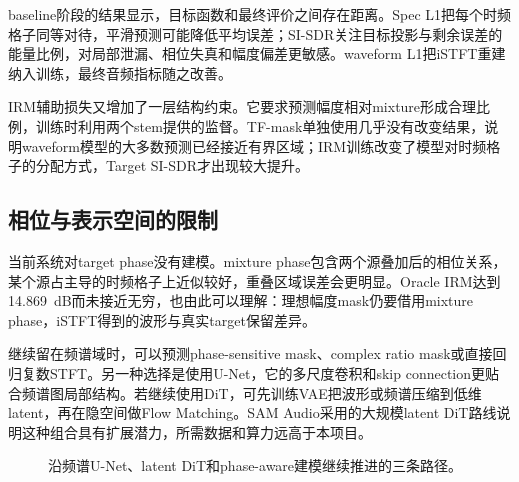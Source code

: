 \documentclass[UTF8,12pt,a4paper]{ctexart}
\begin{document}
baseline阶段的结果显示，目标函数和最终评价之间存在距离。Spec L1把每个时频格子同等对待，平滑预测可能降低平均误差；SI-SDR关注目标投影与剩余误差的能量比例，对局部泄漏、相位失真和幅度偏差更敏感。waveform L1把iSTFT重建纳入训练，最终音频指标随之改善。

IRM辅助损失又增加了一层结构约束。它要求预测幅度相对mixture形成合理比例，训练时利用两个stem提供的监督。TF-mask单独使用几乎没有改变结果，说明waveform模型的大多数预测已经接近有界区域；IRM训练改变了模型对时频格子的分配方式，Target SI-SDR才出现较大提升。

\subsection{相位与表示空间的限制}

当前系统对target phase没有建模。mixture phase包含两个源叠加后的相位关系，某个源占主导的时频格子上近似较好，重叠区域误差会更明显。Oracle IRM达到14.869~dB而未接近无穷，也由此可以理解：理想幅度mask仍要借用mixture phase，iSTFT得到的波形与真实target保留差异。

继续留在频谱域时，可以预测phase-sensitive mask、complex ratio mask或直接回归复数STFT。另一种选择是使用U-Net，它的多尺度卷积和skip connection更贴合频谱图局部结构。若继续使用DiT，可先训练VAE把波形或频谱压缩到低维latent，再在隐空间做Flow Matching。SAM Audio采用的大规模latent DiT路线说明这种组合具有扩展潜力，所需数据和算力远高于本项目。

\begin{figure}[H]
  \centering
  \caption{沿频谱U-Net、latent DiT和phase-aware建模继续推进的三条路径。}
  \label{fig:future}
\end{figure}
\end{document}
